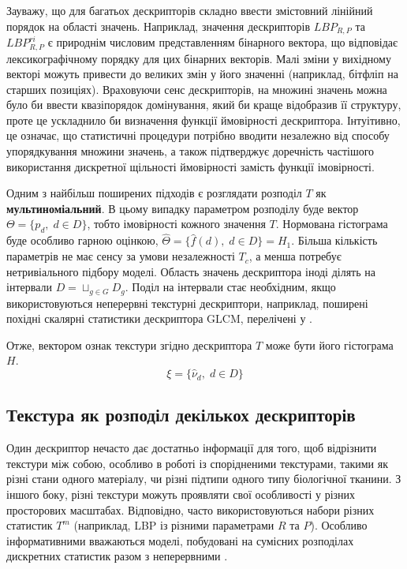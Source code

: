 Зауважу, що для багатьох дескрипторів складно ввести змістовний лінійний порядок на області значень. 
Наприклад, значення дескрипторів $LBP_{R,P}$ та $LBP^{ri}_{R,P}$ є природнім числовим представленням бінарного вектора, що відповідає лексикографічному порядку для цих бінарних векторів.
Малі зміни у вихідному векторі можуть привести до великих змін у його значенні (наприклад, бітфліп на старших позиціях).
Враховуючи сенс дескрипторів, на множині значень можна було би ввести квазіпорядок домінування, який би краще відобразив її структуру, проте це ускладнило би визначення функції ймовірності дескриптора.
Інтуітивно, це означає, що статистичні процедури потрібно вводити незалежно від способу упорядкування множини значень, 
а також підтверджує доречність частішого використання дискретної щільності ймовірності замість функції імовірності.

Одним з найбільш поширених підходів є розглядати розподіл $T$ як \textbf{мультиноміальний}. 
В цьому випадку параметром розподілу буде вектор $\Theta = \{p_d, \; d\in D\}$, тобто імовірності кожного значення $T$.
Нормована гістограма буде особливо гарною оцінкою, $\hat \Theta = \{\hat f(d), \; d\in D\} = H_1$.
Більша кількість параметрів не має сенсу за умови незалежності $T_c$, а менша потребує нетривіального підбору моделі.
Область значень дескриптора іноді ділять на інтервали $D = \sqcup_{g\in G} D_g$.
Поділ на інтервали стає необхідним, якщо використовуються неперервні текстурні дескриптори, 
наприклад, поширені похідні скалярні статистики дескриптора GLCM, перелічені у \cite{belsare2015}.

Отже, вектором ознак текстури згідно дескриптора $T$ може бути його гістограма $H$.
\begin{equation*}
    \xi = \{\hat\nu_d, \; d\in D\}
\end{equation*}

\subsection{Текстура як розподіл декількох дескрипторів}\label{section1.2b}\hfill

Один дескриптор нечасто дає достатньо інформації для того, щоб відрізнити текстури між собою, особливо в роботі із спорідненими текстурами, 
такими як різні стани одного матеріалу, чи різні підтипи одного типу біологічної тканини.
З іншого боку, різні текстури можуть проявляти свої особливості у різних просторових масштабах.
Відповідно, часто використовуються набори різних статистик $T^m$ (наприклад, LBP із різними параметрами $R$ та $P$).
Особливо інформативними вважаються моделі, побудовані на сумісних розподілах дискретних статистик разом з неперервними \cite{guo2010lbpv}.

